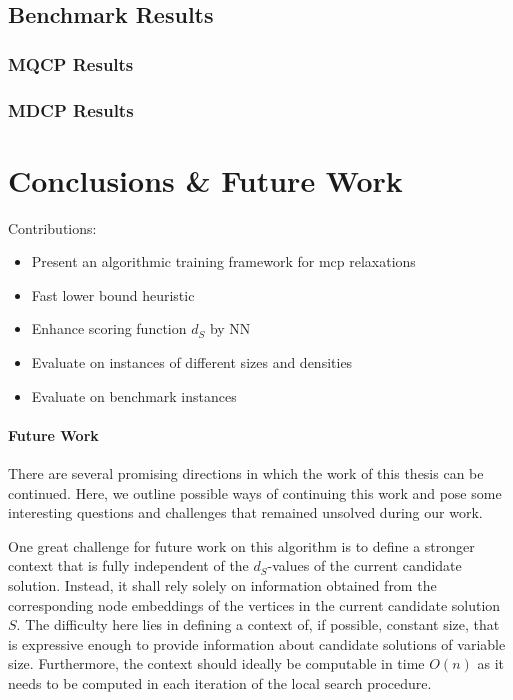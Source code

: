 \documentclass[draft,final]{vutinfth} %
\begin{document}
\section{Benchmark Results}

\subsection{MQCP Results}
\subsection{MDCP Results}





\chapter{Conclusions \& Future Work}\label{chp:conclusions}

Contributions:
\begin{itemize}
    \item Present an algorithmic training framework for mcp relaxations
    \item Fast lower bound heuristic
    \item Enhance scoring function $d_S$ by NN 
    \item Evaluate on instances of different sizes and densities
    \item Evaluate on benchmark instances
\end{itemize}

\subsubsection{Future Work}

There are several promising directions in which the work of this thesis can be continued. Here, we outline possible ways of continuing this work and pose some interesting questions and challenges that remained unsolved during our work. 

One great challenge for future work on this algorithm is to define a stronger context that is fully independent of the $d_S$-values of the current candidate solution. Instead, it shall rely solely on information obtained from the corresponding node embeddings of the vertices in the current candidate solution $S$. The difficulty here lies in defining a context of, if possible, constant size, that is expressive enough to provide information about candidate solutions of variable size. Furthermore, the context should ideally be computable in time $O(n)$ as it needs to be computed in each iteration of the local search procedure. 
\end{document}
